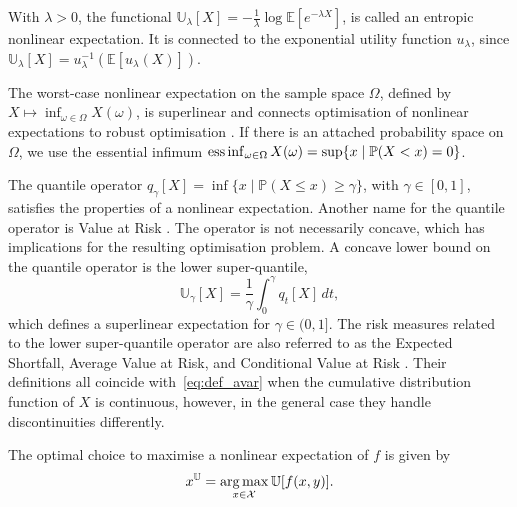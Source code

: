 \documentclass[main.tex]{subfiles}
\begin{document}
\begin{example}
  With $\lambda>0$, the functional
  $\mathbb{U}_\lambda[X]=-\frac{1}{\lambda}\log\mathbb{E}[e^{-\lambda
    X}]$, is called an entropic nonlinear expectation.
  It is connected to the exponential utility function $u_\lambda$, since
  $\mathbb{U}_\lambda[X]= u_\lambda^{-1}(\mathbb{E}[u_\lambda(X)])$.

  The worst-case nonlinear expectation on the sample space $\Omega$,
  defined by
  $X\mapsto  \inf_{\omega\in\Omega}X(\omega)$, is superlinear and
  connects optimisation of nonlinear expectations to robust optimisation \citep{ben2009robust}.
  If there is an attached
  probability space on $\Omega$,
  we use the essential infimum
  $\operatorname*{ess\,inf}_{\omega\in\Omega} X(\omega) = \sup\{x \mid \mathbb{P}(X<x)=0\}$.

  The quantile operator
  $q_\gamma[X] = \inf\{x\mid\mathbb{P}(X\leq x)\geq
  \gamma\}$, with $\gamma\in[0,1]$, satisfies the properties of a
  nonlinear expectation.
  Another name for the quantile operator is Value at Risk \citep{follmer2004stochastic}.
  The operator is not necessarily concave, which has
  implications for the resulting optimisation problem.
  A concave lower bound on the quantile operator is
  the lower super-quantile,
  \begin{equation}\label{eq:def_avar}
    \mathbb{U}_\gamma[X]=\frac{1}{\gamma}\int_0^\gamma q_t[X]\, dt,
  \end{equation}
  which defines a superlinear expectation for $\gamma\in(0,1]$.
  The risk measures related to the lower super-quantile operator are also referred to as
  the Expected Shortfall, Average Value at Risk, and Conditional Value at Risk
  \citep{artzner1999coherent,rockafellar2002conditional,follmer2004stochastic,rockafellar2013fundamental}.
  Their definitions all coincide with~\eqref{eq:def_avar} when the
  cumulative distribution function of $X$ is continuous, however, in
  the general case they handle discontinuities differently.
\end{example}


\begin{problem}
  The optimal choice to maximise a nonlinear expectation
  of $f$ is given by
  \begin{align}
    x^{\mathbb{U}}=\operatorname*{arg\,max}_{x\in\mathcal{X}} \mathbb{U}[f(x,y)].
  \end{align}
\end{problem}
\end{document}
